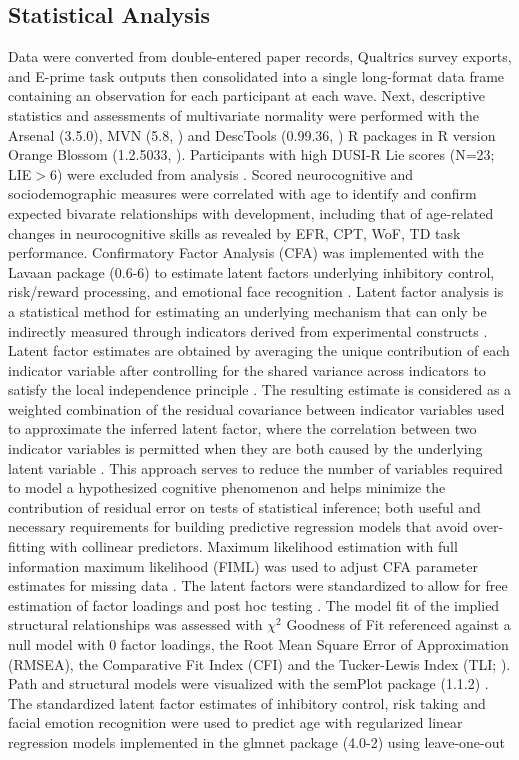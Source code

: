 \documentclass[utf8]{frontiersSCNS} %
\begin{document}
\subsection{Statistical Analysis} Data were converted from double-entered paper records, Qualtrics survey exports, and E-prime task outputs then consolidated into a single long-format data frame containing an observation for each participant at each wave. Next, descriptive statistics and assessments of multivariate normality were performed with the Arsenal (3.5.0), MVN (5.8, \cite{MVN}) and DescTools (0.99.36, \cite{DescTools}) R packages in R version Orange Blossom (1.2.5033, \cite{R}). Participants with high DUSI-R Lie scores (N=23; LIE$>6$) were excluded from analysis \citep{dalla2003effects}. Scored neurocognitive and sociodemographic measures were correlated with age to identify and confirm expected bivarate relationships with development, including that of age-related changes in neurocognitive skills as revealed by EFR, CPT, WoF, TD task performance. Confirmatory Factor Analysis (CFA) was implemented with the Lavaan package (0.6-6) to estimate latent factors underlying inhibitory control, risk/reward processing, and emotional face recognition \citep{Lavaan}. Latent factor analysis is a statistical method for estimating an underlying mechanism that can only be indirectly measured through indicators derived from experimental constructs \citep{finch2015latent}. Latent factor estimates are obtained by averaging the unique contribution of each indicator variable after controlling for the shared variance across indicators to satisfy the local independence principle \citep{sobel1997measurement}. The resulting estimate is considered as a weighted combination of the residual covariance between indicator variables used to approximate the inferred latent factor, where the correlation between two indicator variables is permitted when they are both caused by the underlying latent variable \citep{cooper2019neuroimaging}. This approach serves to reduce the number of variables required to model a hypothesized cognitive phenomenon and helps minimize the contribution of residual error on tests of statistical inference; both useful and necessary requirements for building predictive regression models that avoid over-fitting with collinear predictors. Maximum likelihood estimation with full information maximum likelihood (FIML) was used to adjust CFA parameter estimates for missing data \citep{cham2017full}. The latent factors were standardized to allow for free estimation of factor loadings and post hoc testing \citep{HuTzeBentler1998}. The model fit of the implied structural relationships was assessed with $\chi^2$ Goodness of Fit referenced against a null model with $0$ factor loadings, the Root Mean Square Error of Approximation (RMSEA), the Comparative Fit Index (CFI) and the Tucker-Lewis Index (TLI; \cite{KennyEtAl2015,HuTzeBentler1999, wu2009evaluating}). Path and structural models were visualized with the semPlot package (1.1.2) . The standardized latent factor estimates of inhibitory control, risk taking and facial emotion recognition were used to predict age with regularized linear regression models implemented in the glmnet package (4.0-2) using leave-one-out 
\end{document}
